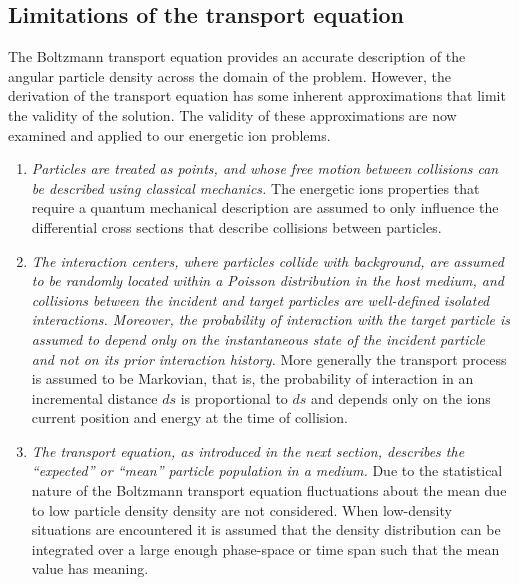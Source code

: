 \subsection{Limitations of the transport equation}
The Boltzmann transport equation provides an accurate description of the angular particle density across the domain of the problem. However, the derivation of the transport equation has some inherent approximations that limit the validity of the solution. The validity of these approximations are now examined and applied to our energetic ion problems.
\begin{enumerate}
  \item \textit{Particles are treated as points, and whose free motion between collisions can be described using classical mechanics.} The energetic ions properties that require a quantum mechanical description are assumed to only influence the differential cross sections that describe collisions between particles.
  
  \item \textit{The interaction centers, where particles collide with background, are assumed to be randomly located within a Poisson distribution in the host medium, and collisions between the incident and target particles are
  well-defined isolated interactions. Moreover, the probability of interaction with the
  target particle is assumed to depend only on the instantaneous state of the incident particle and not on its
  prior interaction history.} More generally the transport process is assumed to be Markovian, that is, the probability of interaction in an incremental distance $ds$ is proportional to $ds$ and depends only on the ions current position and energy at the time of collision.

  \item \textit{The transport equation, as introduced in the next section, describes the “expected” or “mean”
  particle population in a medium.} Due to the statistical nature of the Boltzmann transport equation fluctuations about the mean due to low particle density density are not considered. When low-density situations are encountered it is assumed that the density distribution can be integrated over a large enough phase-space or time span such that the mean value has meaning.


\end{enumerate}
